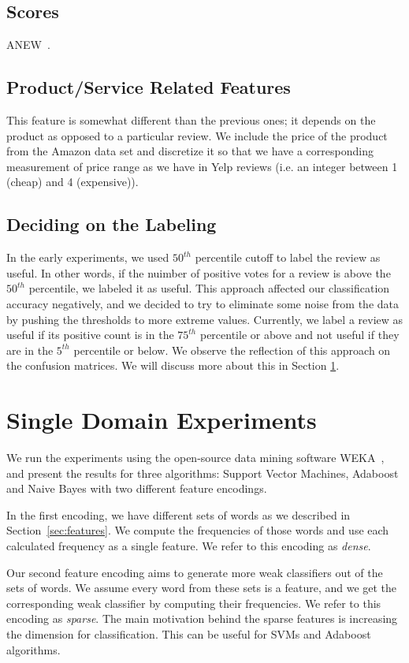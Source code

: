 \documentclass[letterpaper]{article}
\begin{document}
\subsection{Scores}
ANEW~\cite{DoddsANEWPaper}.

\subsection{Product/Service Related Features} 
This feature is somewhat different than the previous ones; it depends
on the product as opposed to a particular review. We include the price
of the product from the Amazon data set and discretize it so that we
have a corresponding measurement of price range as we have in Yelp
reviews (i.e. an integer between 1 (cheap) and 4 (expensive)).

\subsection{Deciding on the Labeling}
In the early experiments, we used $50^{th}$ percentile cutoff to label
the review as useful. In other words, if the nuimber of positive votes
for a review is above the $50^{th}$ percentile, we labeled it as
useful. This approach affected our classification accuracy negatively,
and we decided to try to eliminate some noise from the data by pushing
the thresholds to more extreme values. Currently, we label a review as
useful if its positive count is in the $75^{th}$ percentile or above
and not useful if they are in the $5^{th}$ percentile or below. We
observe the reflection of this approach on the confusion matrices. We
will discuss more about this in Section \ref{sec:single_domain}.

\section{Single Domain Experiments}
\label{sec:single_domain}  
We run the experiments using the open-source data mining software
WEKA~\cite{weka}, and present the results for three algorithms:
Support Vector Machines, Adaboost and Naive Bayes with two different
feature encodings.

In the first encoding, we have different sets of words as we described
in Section~\ref{sec:features}. We compute the frequencies of those
words and use each calculated frequency as a single feature. We refer to
this encoding as \emph{dense}.

Our second feature encoding aims to generate more weak classifiers out
of the sets of words. We assume every word from these sets is a
feature, and we get the corresponding weak classifier by computing
their frequencies. We refer to this encoding as \emph{sparse}. The
main motivation behind the sparse features is increasing the dimension
for classification. This can be useful for SVMs and Adaboost
algorithms.
\end{document}
